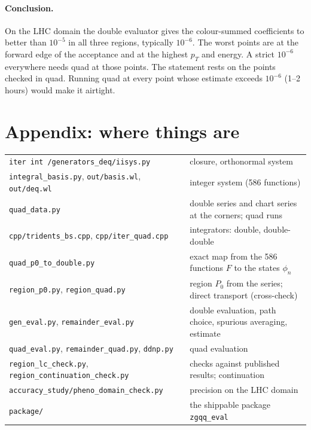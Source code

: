 \documentclass[11pt]{article}
\begin{document}
\paragraph{Conclusion.} On the LHC domain the double evaluator gives the colour-summed coefficients to better than
$10^{-5}$ in all three regions, typically $10^{-6}$. The worst points are at the forward edge of the acceptance and at
the highest $p_T$ and energy. A strict $10^{-6}$ everywhere needs quad at those points. The statement rests on the
points checked in quad. Running quad at every point whose estimate exceeds $10^{-6}$ (1--2 hours) would make it
airtight.

\appendix
\section*{Appendix: where things are}
\begin{center}\footnotesize
\begin{tabular}{ll}\toprule
\texttt{iter int /generators\_deq/iisys.py} & closure, orthonormal system \\
\texttt{integral\_basis.py}, \texttt{out/basis.wl}, \texttt{out/deq.wl} & integer system (586 functions) \\
\texttt{quad\_data.py} & double series and chart series at the corners; quad runs \\
\texttt{cpp/tridents\_bs.cpp}, \texttt{cpp/iter\_quad.cpp} & integrators: double, double-double \\
\texttt{quad\_p0\_to\_double.py} & exact map from the 586 functions $F$ to the states $\phi_n$ \\
\texttt{region\_p0.py}, \texttt{region\_quad.py} & region $P_0$ from the series; direct transport (cross-check) \\
\texttt{gen\_eval.py}, \texttt{remainder\_eval.py} & double evaluation, path choice, spurious averaging, estimate \\
\texttt{quad\_eval.py}, \texttt{remainder\_quad.py}, \texttt{ddnp.py} & quad evaluation \\
\texttt{region\_lc\_check.py}, \texttt{region\_continuation\_check.py} & checks against published results; continuation \\
\texttt{accuracy\_study/pheno\_domain\_check.py} & precision on the LHC domain \\
\texttt{package/} & the shippable package \texttt{zgqq\_eval} \\ \bottomrule
\end{tabular}
\end{center}
\end{document}
